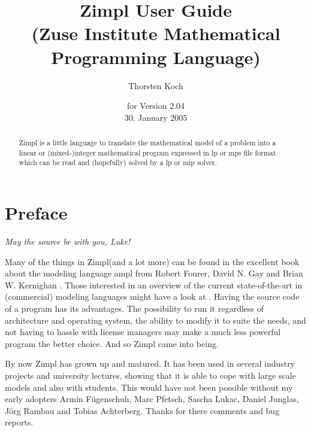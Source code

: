 \documentclass[11pt]{article}
\newcommand{\zimpl}{{\sc Zimpl}\xspace}
\newcommand{\lp}{{\sc lp}\xspace}
\newcommand{\mip}{{\sc mip}\xspace}
\newcommand{\mps}{{\sc mps}\xspace}
\newcommand{\lpf}{{\sc lp}\xspace}
\newcommand{\ampl}{{\sc ampl}\xspace}
\newcommand{\ilog}{{\sc ilog}\xspace}
\newcommand{\cplex}{{\sc cplex}\xspace}
\begin{document}

\title{
\LARGE\zimpl User Guide\\
\normalsize (Zuse Institute Mathematical Programming Language)}
\author{Thorsten Koch}
\date{\small for Version 2.04\\30. January 2005}
\maketitle
\vfill
\tableofcontents
\newpage
\begin{abstract}
\zimpl is a little language to translate the mathematical model of a 
problem into a linear or (mixed-)integer mathematical program
expressed in \lpf or \mps file format which can be read
and (hopefully) solved by a \lp or \mip solver.
\end{abstract}
\section{Preface}
\begin{flushright}
{\em May the source be with you, Luke!}
\end{flushright}
Many of the things in \zimpl (and a lot more) can be found in 
the excellent book about the modeling language \ampl 
from Robert Fourer, David N. Gay and Brian W. Kernighan
\cite{FourierGayKernighan2003}. Those interested in an overview of the
current state-of-the-art in (commercial) modeling languages might have
a look at \cite{Kallrath2004}.
Having the source code of a program has its advantages. The
possibility to run it regardless of architecture and operating system, the
ability to modify it to suite the needs, and not having to hassle with license
managers may make a much less powerful program the better choice.
And so \zimpl came into being.

\bigskip
By now \zimpl has grown up and matured. It has been used in several
industry projects and university lectures, showing that it is able to
cope with large scale models and also with students.
This would have not been possible without my early adopters 
Armin F\"ugenschuh, Marc Pfetsch, Sascha Lukac, Daniel Junglas, J\"org
Rambau and Tobias Achterberg. Thanks for there comments and bug
reports.
\end{document}

